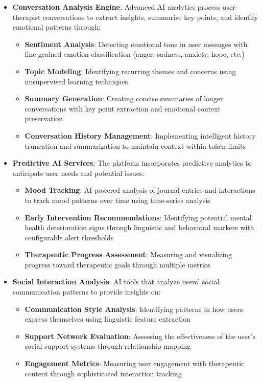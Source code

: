 \begin{itemize}
  \item \textbf{Conversation Analysis Engine}: Advanced AI analytics process user-therapist conversations to extract insights, summarize key points, and identify emotional patterns through:
    \begin{itemize}
      \item \textbf{Sentiment Analysis}: Detecting emotional tone in user messages with fine-grained emotion classification (anger, sadness, anxiety, hope, etc.)
      \item \textbf{Topic Modeling}: Identifying recurring themes and concerns using unsupervised learning techniques
      \item \textbf{Summary Generation}: Creating concise summaries of longer conversations with key point extraction and emotional context preservation
      \item \textbf{Conversation History Management}: Implementing intelligent history truncation and summarization to maintain context within token limits
    \end{itemize}
  
  \item \textbf{Predictive AI Services}: The platform incorporates predictive analytics to anticipate user needs and potential issues:
    \begin{itemize}
      \item \textbf{Mood Tracking}: AI-powered analysis of journal entries and interactions to track mood patterns over time using time-series analysis
      \item \textbf{Early Intervention Recommendations}: Identifying potential mental health deterioration signs through linguistic and behavioral markers with configurable alert thresholds
      \item \textbf{Therapeutic Progress Assessment}: Measuring and visualizing progress toward therapeutic goals through multiple metrics
    \end{itemize}
    
  \item \textbf{Social Interaction Analysis}: AI tools that analyze users' social communication patterns to provide insights on:
    \begin{itemize}
      \item \textbf{Communication Style Analysis}: Identifying patterns in how users express themselves using linguistic feature extraction
      \item \textbf{Support Network Evaluation}: Assessing the effectiveness of the user's social support systems through relationship mapping
      \item \textbf{Engagement Metrics}: Measuring user engagement with therapeutic content through sophisticated interaction tracking
    \end{itemize}
    

\end{itemize}
